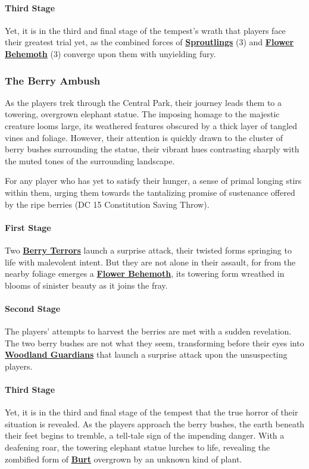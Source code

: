 \paragraph*{Third Stage}
Yet, it is in the third and final stage of the tempest's wrath that players face their greatest trial yet, as the combined forces of \hyperref[sec:Sproutling]{\textbf{Sproutlings}} (3) and \hyperref[sec:FlowerBehemoth]{\textbf{Flower Behemoth}} (3) converge upon them with unyielding fury.
\subsubsection*{The Berry Ambush}
As the players trek through the Central Park, their journey leads them to a towering, overgrown elephant statue. The imposing homage to the majestic creature looms large, its weathered features obscured by a thick layer of tangled vines and foliage. However, their attention is quickly drawn to the cluster of berry bushes surrounding the statue, their vibrant hues contrasting sharply with the muted tones of the surrounding landscape.

For any player who has yet to satisfy their hunger, a sense of primal longing stirs within them, urging them towards the tantalizing promise of sustenance offered by the ripe berries (DC 15 Constitution Saving Throw).

\paragraph*{First Stage}
Two \hyperref[sec:BerryTerror]{\textbf{Berry Terrors}} launch a surprise attack, their twisted forms springing to life with malevolent intent. But they are not alone in their assault, for from the nearby foliage emerges a \hyperref[sec:FlowerBehemoth]{\textbf{Flower Behemoth}}, its towering form wreathed in blooms of sinister beauty as it joins the fray.\\

\paragraph*{Second Stage}
The players' attempts to harvest the berries are met with a sudden revelation. The two berry bushes are not what they seem, transforming before their eyes into \hyperref[sec:WoodlandGuardian]{\textbf{Woodland Guardians}} that launch a surprise attack upon the unsuspecting players.\\

\paragraph*{Third Stage}
Yet, it is in the third and final stage of the tempest that the true horror of their situation is revealed. As the players approach the berry bushes, the earth beneath their feet begins to tremble, a tell-tale sign of the impending danger. With a deafening roar, the towering elephant statue lurches to life, revealing the zombified form of \hyperref[sec:VexiniteBurt]{\textbf{Burt}} overgrown by an unknown kind of plant.\\

